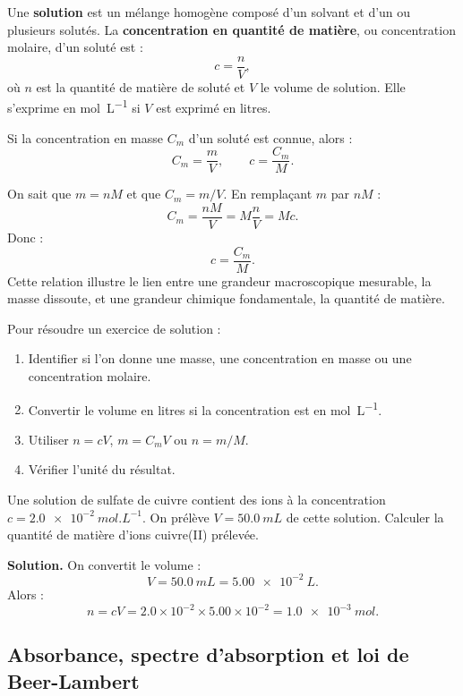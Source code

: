 \documentclass[11pt,a4paper]{article}
\begin{document}
\begin{definitionbox}
Une \textbf{solution} est un mélange homogène composé d'un solvant et d'un ou plusieurs solutés. La \textbf{concentration en quantité de matière}, ou concentration molaire, d'un soluté est :
\[
c=\frac{n}{V},
\]
où $n$ est la quantité de matière de soluté et $V$ le volume de solution. Elle s'exprime en \si{mol.L^{-1}} si $V$ est exprimé en litres.
\end{definitionbox}

\begin{propositionbox}
Si la concentration en masse $C_m$ d'un soluté est connue, alors :
\[
C_m=\frac{m}{V}, \qquad c=\frac{C_m}{M}.
\]
\end{propositionbox}

\begin{demobox}
On sait que $m=nM$ et que $C_m=m/V$. En remplaçant $m$ par $nM$ :
\[
C_m=\frac{nM}{V}=M\frac{n}{V}=Mc.
\]
Donc :
\[
c=\frac{C_m}{M}.
\]
Cette relation illustre le lien entre une grandeur macroscopique mesurable, la masse dissoute, et une grandeur chimique fondamentale, la quantité de matière.
\end{demobox}

\begin{methodbox}
Pour résoudre un exercice de solution :
\begin{enumerate}
\item Identifier si l'on donne une masse, une concentration en masse ou une concentration molaire.
\item Convertir le volume en litres si la concentration est en \si{mol.L^{-1}}.
\item Utiliser $n=cV$, $m=C_mV$ ou $n=m/M$.
\item Vérifier l'unité du résultat.
\end{enumerate}
\end{methodbox}

\begin{exemplebox}
Une solution de sulfate de cuivre contient des ions  à la concentration $c=\SI{2.0e-2}{mol.L^{-1}}$. On prélève $V=\SI{50.0}{mL}$ de cette solution. Calculer la quantité de matière d'ions cuivre(II) prélevée.

\textbf{Solution.} On convertit le volume :
\[
V=\SI{50.0}{mL}=\SI{5.00e-2}{L}.
\]
Alors :
\[
n=cV=2.0\times10^{-2}\times5.00\times10^{-2}=\SI{1.0e-3}{mol}.
\]
\end{exemplebox}

\subsection{Absorbance, spectre d'absorption et loi de Beer-Lambert}
\end{document}
